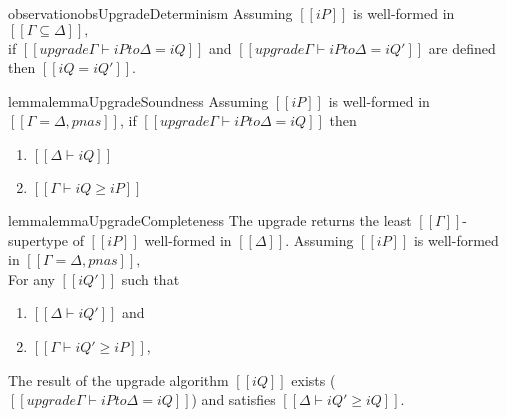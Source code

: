 \begin{restatable}{observation}{obsUpgradeDeterminism}
    \label{obs:upgrade-deterministic}
    Assuming $[[iP]]$ is well-formed in $[[Γ ⊆ Δ]],$\\
    if $[[upgrade Γ ⊢ iP to Δ = iQ]]$ and $[[upgrade Γ ⊢ iP to Δ = iQ']]$ are defined 
    then $[[iQ = iQ']]$.
\end{restatable}

\begin{restatable}{lemma}{lemmaUpgradeSoundness}
    \label{lemma:upgrade-soundness}
    Assuming $[[iP]]$ is well-formed in $[[Γ = Δ, pnas]]$,
    if $[[upgrade Γ ⊢ iP to Δ = iQ]]$
    then
    \begin{enumerate}
        \item $[[Δ ⊢ iQ]]$
        \item $[[Γ ⊢ iQ ≥ iP]]$
    \end{enumerate}
\end{restatable}

\begin{restatable}{lemma}{lemmaUpgradeCompleteness}
    \label{lemma:upgrade-completeness}
    The upgrade returns the least $[[Γ]]$-supertype of $[[iP]]$ well-formed in $[[Δ]]$.
    Assuming $[[iP]]$ is well-formed in $[[Γ = Δ, pnas]],$\\
    For any $[[iQ']]$ such that 
    \begin{enumerate}
        \item $[[Δ ⊢ iQ']]$ and
        \item $[[Γ ⊢ iQ' ≥ iP]]$,
    \end{enumerate}

    The result of the upgrade algorithm $[[iQ]]$ exists
    ($[[upgrade Γ ⊢ iP to Δ = iQ]]$) and satisfies $[[Δ ⊢ iQ' ≥ iQ]]$.
\end{restatable}
